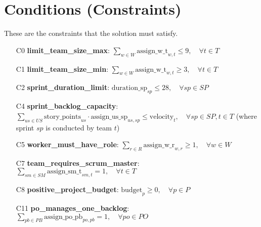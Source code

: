 \documentclass[11pt]{article}
\begin{document}
\section{Conditions (Constraints)}
These are the constraints that the solution must satisfy.
\begin{itemize}
    \item[C0] \textbf{limit\_team\_size\_max}: $ \sum_{w \in W} \text{assign\_w\_t}_{w,t} \leq 9, \quad \forall t \in T $
    \item[C1] \textbf{limit\_team\_size\_min}: $ \sum_{w \in W} \text{assign\_w\_t}_{w,t} \geq 3, \quad \forall t \in T $
    \item[C2] \textbf{sprint\_duration\_limit}: $ \text{duration\_sp}_{sp} \leq 28, \quad \forall sp \in SP $
    \item[C4] \textbf{sprint\_backlog\_capacity}: $ \sum_{us \in US} \text{story\_points}_{us} \cdot \text{assign\_us\_sp}_{us,sp} \leq \text{velocity}_t, \quad \forall sp \in SP, t \in T $ (where sprint $sp$ is conducted by team $t$)
    \item[C5] \textbf{worker\_must\_have\_role}: $ \sum_{r \in R} \text{assign\_w\_r}_{w,r} \geq 1, \quad \forall w \in W $
    \item[C7] \textbf{team\_requires\_scrum\_master}: $ \sum_{sm \in SM} \text{assign\_sm\_t}_{sm,t} = 1, \quad \forall t \in T $
    \item[C8] \textbf{positive\_project\_budget}: $ \text{budget}_p \geq 0, \quad \forall p \in P $
    \item[C11] \textbf{po\_manages\_one\_backlog}: $ \sum_{pb \in PB} \text{assign\_po\_pb}_{po,pb} = 1, \quad \forall po \in PO $
\end{itemize}
\end{document}
